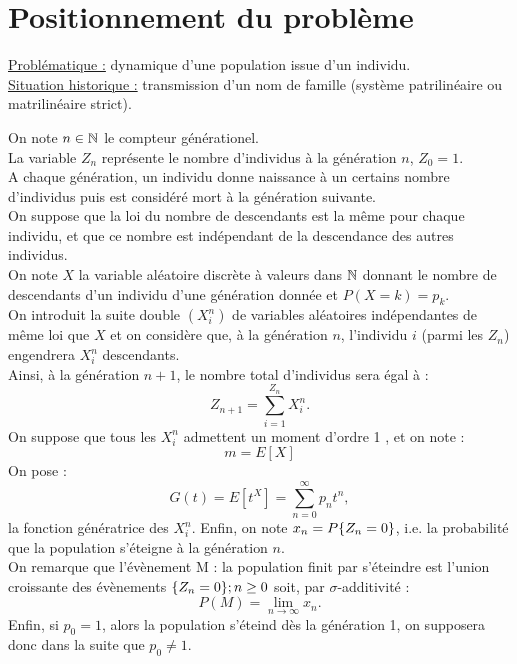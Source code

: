 \newcommand{\om}{\Omega}
\renewcommand{\a}{\mathcal{A}}
\newcommand{\f}{\mathcal{f}}




\pagestyle{fancy}

\fancyhead[R]{}



\section{Positionnement du problème}

\underline{Problématique :} dynamique d'une population issue d'un individu. \\

\underline{Situation historique :} transmission d'un nom de famille (système patrilinéaire ou matrilinéaire strict). \\

\begin{nota}
On note $n \in \mathbb{N}$ le compteur générationel. \\
La variable $Z_n$ représente le nombre d'individus à la génération $n$, $Z_0 = 1$. \\
A chaque génération, un individu donne naissance à un certains nombre d'individus puis est considéré mort à la génération suivante. \\
On suppose que la loi du nombre de descendants est la même pour chaque individu, et que ce nombre est indépendant de la
descendance des autres individus. \\
On note $X$ la variable aléatoire discrète à valeurs dans $\mathbb{N}$ donnant le nombre de descendants d'un individu d'une génération 
donnée et $P(X=k) = p_k$. \\
On introduit la suite double $(X_i^n)$ de variables aléatoires indépendantes de même loi que $X$ et on considère que, 
à la génération $n$, l'individu $i$ (parmi les $Z_n$) engendrera $X_i^n$ descendants. \\
Ainsi, à la génération $n+1$, le nombre total d'individus sera égal à :
\[ Z_{n+1} = \sum_{i=1}^{Z_n} X_i^n . \] 
On suppose que tous les $X_i^n$ admettent un moment d'ordre 1 , et on note :
\[ m = E[X] \] 
On pose :
\[ G(t) = E[t^X] = \sum_{n=0}^{\infty} p_n t^n , \]
la fonction génératrice des $X_i^n$. Enfin, on note $x_n = P \{ Z_n = 0 \}$, i.e. la probabilité que la population s'éteigne à la génération
$n$. \\
On remarque que l'évènement \og M : la population finit par s'éteindre \fg{} est l'union croissante des évènements 
$\{ Z_n = 0 \} ; n \geq 0$ soit, par $\sigma$-additivité :
\[ P(M) = \lim_{n \to \infty} x_n . \]
Enfin, si $p_0 = 1$, alors la population s'éteind dès la génération 1, on supposera donc dans la suite que $p_0 \neq 1$.
\end{nota}

